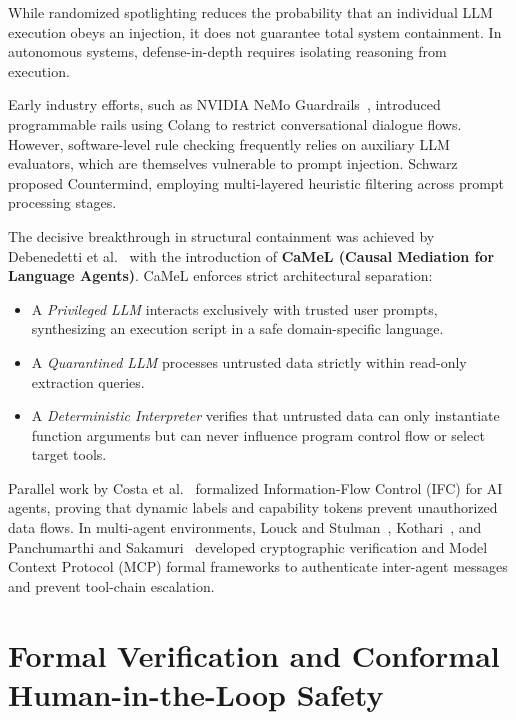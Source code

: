 While randomized spotlighting reduces the probability that an individual LLM execution obeys an injection, it does not guarantee total system containment. In autonomous systems, defense-in-depth requires isolating reasoning from execution.

Early industry efforts, such as NVIDIA NeMo Guardrails~\cite{rebedea2023nemo}, introduced programmable rails using Colang to restrict conversational dialogue flows. However, software-level rule checking frequently relies on auxiliary LLM evaluators, which are themselves vulnerable to prompt injection. Schwarz~\cite{schwarz2025countermind} proposed Countermind, employing multi-layered heuristic filtering across prompt processing stages.

The decisive breakthrough in structural containment was achieved by Debenedetti et al.~\cite{debenedetti2025camel} with the introduction of \textbf{CaMeL (Causal Mediation for Language Agents)}. CaMeL enforces strict architectural separation:
\begin{itemize}
    \item A \emph{Privileged LLM} interacts exclusively with trusted user prompts, synthesizing an execution script in a safe domain-specific language.
    \item A \emph{Quarantined LLM} processes untrusted data strictly within read-only extraction queries.
    \item A \emph{Deterministic Interpreter} verifies that untrusted data can only instantiate function arguments but can never influence program control flow or select target tools.
\end{itemize}

Parallel work by Costa et al.~\cite{costa2025securing} formalized Information-Flow Control (IFC) for AI agents, proving that dynamic labels and capability tokens prevent unauthorized data flows. In multi-agent environments, Louck and Stulman~\cite{louck2026security}, Kothari~\cite{kothari2025hash}, and Panchumarthi and Sakamuri~\cite{panchumarthi2025securing} developed cryptographic verification and Model Context Protocol (MCP) formal frameworks \cite{mcp2026formal} to authenticate inter-agent messages and prevent tool-chain escalation.

\section{Formal Verification and Conformal Human-in-the-Loop Safety}
\label{sec:rel_formal_verification}

